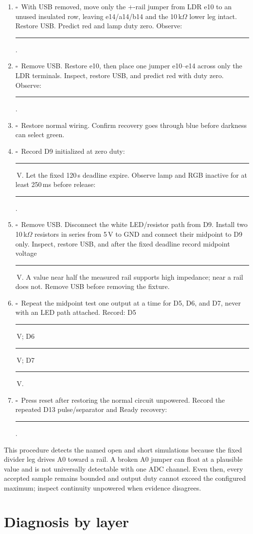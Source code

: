 \documentclass[11pt]{article}
\newcommand{\checkbox}{\(\square\)}
\newcommand{\blank}[1]{\rule{#1}{0.4pt}}
\begin{document}
\begin{enumerate}
  \item \checkbox\ With USB removed, move only the \(+\)-rail jumper from LDR
        e10 to an unused insulated row, leaving e14/a14/b14 and the 10\,k\(\Omega\)
        lower leg intact. Restore USB. Predict red and lamp duty zero.
        Observe: \blank{2.4in}.
  \item \checkbox\ Remove USB. Restore e10, then place one jumper e10--e14
        across only the LDR terminals. Inspect, restore USB, and predict red
        with duty zero.
        Observe: \blank{2.4in}.
  \item \checkbox\ Restore normal wiring. Confirm recovery goes through blue
        before darkness can select green.
  \item \checkbox\ Record D9 initialized at zero duty: \blank{.8in}\,V. Let the
        fixed 120\,s deadline expire. Observe lamp and RGB inactive for at
        least 250\,ms before release: \blank{1.5in}.
  \item \checkbox\ Remove USB. Disconnect the white LED/resistor path from D9.
        Install two 10\,k\(\Omega\) resistors in series from 5\,V to GND and
        connect their midpoint to D9 only. Inspect, restore USB, and after the
        fixed deadline record midpoint voltage \blank{.7in}\,V. A value near
        half the measured rail supports high impedance; near a rail does not.
        Remove USB before removing the fixture.
  \item \checkbox\ Repeat the midpoint test one output at a time for D5, D6,
        and D7, never with an LED path attached. Record:
        D5 \blank{.55in}\,V; D6 \blank{.55in}\,V; D7 \blank{.55in}\,V.
  \item \checkbox\ Press reset after restoring the normal circuit unpowered.
        Record the repeated D13 pulse/separator and Ready recovery:
        \blank{2.0in}.
\end{enumerate}

This procedure detects the named open and short simulations because the fixed
divider leg drives A0 toward a rail. A broken A0 jumper can float at a plausible
value and is not universally detectable with one ADC channel. Even then, every
accepted sample remains bounded and output duty cannot exceed the configured
maximum; inspect continuity unpowered when evidence disagrees.

\section{Diagnosis by layer}
\end{document}

